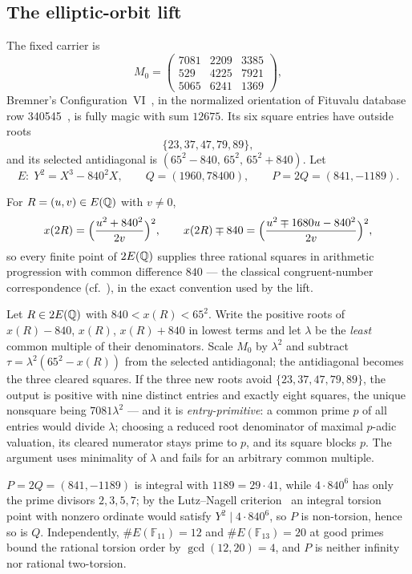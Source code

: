 \subsection{The elliptic-orbit lift}

The fixed carrier is
\[
M_0=\begin{pmatrix}
7081 & 2209 & 3385\\
529 & 4225 & 7921\\
5065 & 6241 & 1369
\end{pmatrix},
\]
Bremner's Configuration~VI~\cite{BRE01}, in the normalized orientation of
Fituvalu database row 340545~\cite{FIT}, is fully magic with sum $12675$.
Its six square entries have outside roots
\[
\{23,37,47,79,89\},
\]
and its selected antidiagonal is
$(65^2-840,\,65^2,\,65^2+840)$. Let
\[
E\colon\;Y^2=X^3-840^2X,\qquad Q=(1960,78400),\qquad P=2Q=(841,-1189).
\]

\begin{lemma}\label{lem:doubling}
For $R=(u,v)\in E(\mathbb{Q})$ with $v\neq0$,
\[
x(2R)=\Bigl(\frac{u^2+840^2}{2v}\Bigr)^{2},\qquad
x(2R)\mp840=\Bigl(\frac{u^2\mp1680u-840^2}{2v}\Bigr)^{2},
\]
so every finite point of $2E(\mathbb{Q})$ supplies three rational squares in
arithmetic progression with common difference $840$ --- the classical
congruent-number correspondence (cf.~\cite{ROB96}), in the exact convention
used by the lift.
\end{lemma}

\begin{lemma}\label{lem:lift}
Let $R\in2E(\mathbb{Q})$ with $840<x(R)<65^2$. Write the positive roots of
$x(R)-840$, $x(R)$, $x(R)+840$ in lowest terms and let $\lambda$ be the
\emph{least} common multiple of their denominators. Scale $M_0$ by
$\lambda^2$ and subtract $\tau=\lambda^2(65^2-x(R))$ from the selected
antidiagonal; the antidiagonal becomes the three cleared squares. If the
three new roots avoid $\{23,37,47,79,89\}$, the output is positive with
nine distinct entries and exactly eight squares, the unique nonsquare being
$7081\lambda^2$ --- and it is \emph{entry-primitive}: a common prime $p$ of
all entries would divide $\lambda$; choosing a reduced root denominator of
maximal $p$-adic valuation, its cleared numerator stays prime to $p$, and
its square blocks $p$. The argument uses minimality of $\lambda$ and fails
for an arbitrary common multiple.
\end{lemma}

\begin{lemma}\label{lem:nontorsion}
$P=2Q=(841,-1189)$ is integral with $1189=29\cdot41$, while
$4\cdot840^{6}$ has only the prime divisors $2,3,5,7$; by the Lutz--Nagell
criterion~\cite[Chap.~VII, Prop.~3.1]{SIL09} an integral torsion point with nonzero ordinate would satisfy
$Y^2\mid4\cdot840^6$, so $P$ is non-torsion, hence so is $Q$.
Independently, $\#E(\mathbb F_{11})=12$ and $\#E(\mathbb F_{13})=20$ at
good primes bound the rational torsion order by $\gcd(12,20)=4$, and $P$
is neither infinity nor rational two-torsion.
\end{lemma}

